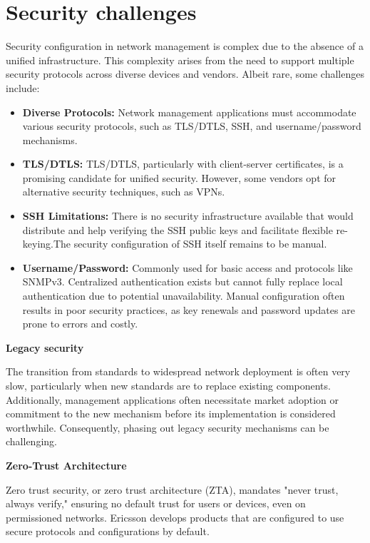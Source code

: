 \documentclass[10pt,sigconf]{iabart}
\begin{document}

\section{Security challenges} \label{security}

Security configuration in network management is complex due to the absence of a unified infrastructure. This complexity arises from the need to support multiple security protocols across diverse devices and vendors. Albeit rare, some challenges include:

\begin{itemize}
    \item \textbf{Diverse Protocols:} Network management applications must accommodate various security protocols, such as TLS/DTLS, SSH, and username/password mechanisms.
    \item \textbf{TLS/DTLS:} TLS/DTLS, particularly with client-server certificates, is a promising candidate for unified security. However, some vendors opt for alternative security techniques, such as VPNs.
    \item \textbf{SSH Limitations:} There is no security infrastructure available that would distribute and help verifying the SSH public keys and facilitate flexible re-keying.The security configuration of SSH itself remains to be manual. %
    \item \textbf{Username/Password:} Commonly used for basic access and protocols like SNMPv3. Centralized authentication exists but cannot fully replace local authentication due to potential unavailability. Manual configuration often results in poor security practices, as key renewals and password updates are prone to errors and costly.

\end{itemize}
 
\textbf{Legacy security}

The transition from standards to widespread network deployment is often very slow, particularly when new standards are to replace existing components. Additionally, management applications often necessitate market adoption or commitment to the new mechanism before its implementation is considered worthwhile. Consequently, phasing out legacy security mechanisms can be challenging.
 
\textbf{Zero-Trust Architecture}

Zero trust security, or zero trust architecture (ZTA), mandates "never trust, always verify," ensuring no default trust for users or devices, even on permissioned networks. Ericsson develops products that are configured to use secure protocols and configurations by default. 
\end{document}
